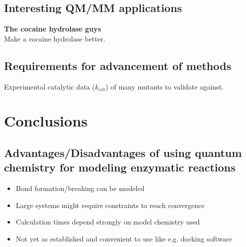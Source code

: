 \subsection{Interesting QM/MM applications}
\textbf{The cocaine hydrolase guys}\\
Make a cocaine hydrolase better\cite{gao2006computational}.

\subsection{Requirements for advancement of methods}
Experimental catalytic data ($k_\text{cat}$) of many mutants to validate against.


\section{Conclusions}\label{sec:conclusions}

\subsection{Advantages/Disadvantages of using quantum chemistry for modeling enzymatic reactions}
\begin{itemize}
\item Bond formation/breaking can be modeled
\item Large systems might require constraints to reach convergence
\item Calculation times depend strongly on model chemistry used
\item Not yet as established and convenient to use like e.g. docking software
\end{itemize}
